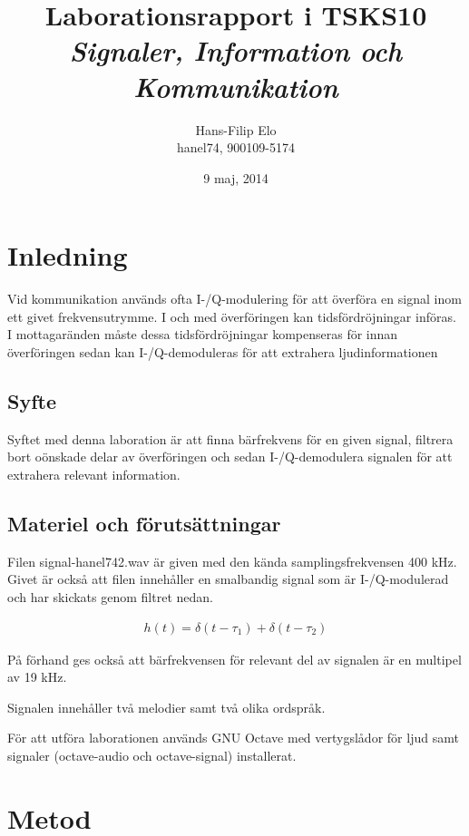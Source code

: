 \documentclass[10pt]{article}
\title{Laborationsrapport i TSKS10 \emph{Signaler, Information och Kommunikation}}
\author{Hans-Filip Elo \\ hanel74, 900109-5174 }
\date{9 maj, 2014}
\begin{document}
\maketitle

\twocolumn

\section{Inledning}

Vid kommunikation används ofta I-/Q-modulering för att överföra en signal inom ett givet frekvensutrymme. I och med överföringen kan tidsfördröjningar införas. I mottagaränden måste dessa tidsfördröjningar kompenseras för innan överföringen sedan kan I-/Q-demoduleras för att extrahera ljudinformationen 

\subsection{Syfte}

Syftet med denna laboration är att finna bärfrekvens för en given signal, filtrera bort oönskade delar av överföringen och sedan I-/Q-demodulera signalen för att extrahera relevant information. 

\subsection{Materiel och förutsättningar}

Filen signal-hanel742.wav är given med den kända samplingsfrekvensen 400 kHz. Givet är också att filen innehåller en smalbandig signal som är I-/Q-modulerad och har skickats genom filtret nedan. 

\begin{gather}
h(t) = \delta(t - \tau_1) + \delta(t - \tau_2)
\label{equ:filter}
\end{gather}

På förhand ges också att bärfrekvensen för relevant del av signalen är en multipel av 19 kHz.

Signalen innehåller två melodier samt två olika ordspråk. 

För att utföra laborationen används GNU Octave med vertygslådor för ljud samt signaler (octave-audio och octave-signal) installerat. 

\newpage

\section{Metod}
\end{document}

